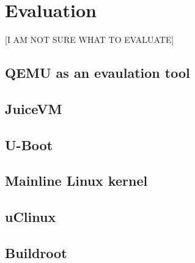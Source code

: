 \chapter{Evaluation}

[I AM NOT SURE WHAT TO EVALUATE]

\section{QEMU as an evaulation tool}

\section{JuiceVM}

\section{U-Boot}

\section{Mainline Linux kernel}

\section{uClinux}

\section{Buildroot}

